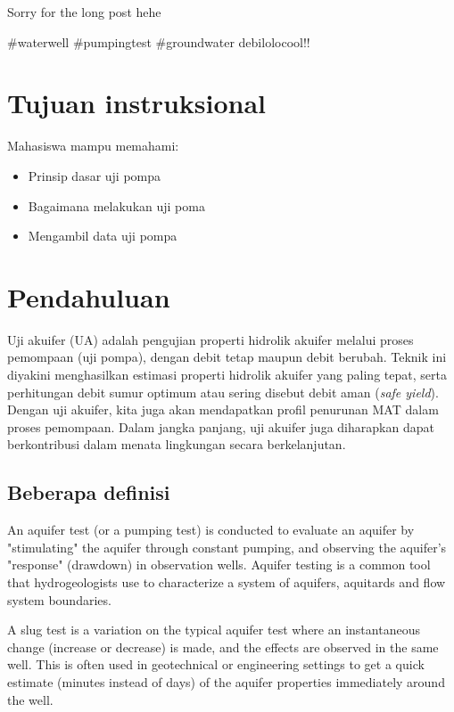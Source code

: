 Sorry for the long post hehe

#waterwell #pumpingtest #groundwater
debilolocool!!

\section{Tujuan instruksional} 

Mahasiswa mampu memahami:
\begin{itemize}
\item Prinsip dasar uji pompa
\end{itemize}
\begin{itemize}
\item Bagaimana melakukan uji poma
\end{itemize}
\begin{itemize}
\item Mengambil data uji pompa
\end{itemize}


\section{Pendahuluan}

Uji akuifer (UA) adalah pengujian properti hidrolik akuifer melalui proses pemompaan (uji pompa), dengan debit tetap maupun debit berubah. Teknik ini diyakini menghasilkan estimasi properti hidrolik akuifer yang paling tepat, serta perhitungan debit sumur optimum atau sering disebut debit aman (\textit{safe yield}). Dengan uji akuifer, kita juga akan mendapatkan profil penurunan MAT dalam proses pemompaan. Dalam jangka panjang, uji akuifer juga diharapkan dapat berkontribusi dalam menata lingkungan secara berkelanjutan.


\subsection{Beberapa definisi}

An aquifer test (or a pumping test) is conducted to evaluate an aquifer by "stimulating" the aquifer through constant pumping, and observing the aquifer's "response" (drawdown) in observation wells. Aquifer testing is a common tool that hydrogeologists use to characterize a system of aquifers, aquitards and flow system boundaries.

A slug test is a variation on the typical aquifer test where an instantaneous change (increase or decrease) is made, and the effects are observed in the same well. This is often used in geotechnical or engineering settings to get a quick estimate (minutes instead of days) of the aquifer properties immediately around the well.

